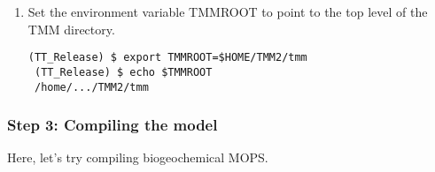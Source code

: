 \documentclass[a4paper]{article}
\def\noin{\noindent }
\begin{document}
\begin{enumerate}
(Optional) If you want to make start changing your own changes, I would suggest making a new branch in your local computer (e.g.., \verb|yournewrepo|), and leave \verb|master| and \verb|TT_Release| untouched.
\begin{lstlisting}[style=DOS]
 (TT_Release) $ git checkout -b yournewrepo
 (yournewrepo) $ git branch --show-current
 yournewrepo
\end{lstlisting}
\item Set the environment variable TMMROOT to point to the top level of the TMM directory.
\begin{lstlisting}[style=DOS]
 (TT_Release) $ export TMMROOT=$HOME/TMM2/tmm
 (TT_Release) $ echo $TMMROOT
 /home/.../TMM2/tmm
\end{lstlisting}
\end{enumerate}

\subsubsection{Step 3: Compiling the model}
\noin Here, let's try compiling biogeochemical MOPS. 
\end{document}
